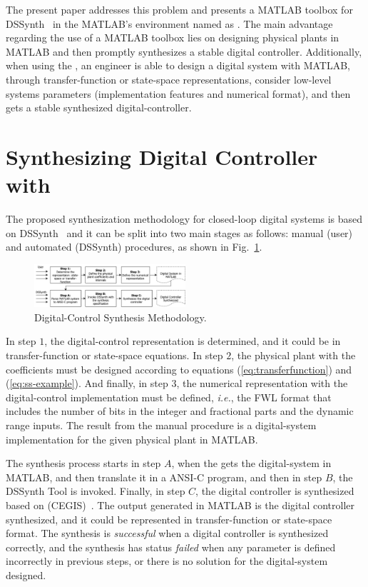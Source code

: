 The present paper addresses this problem and presents a MATLAB toolbox for DSSynth~\cite{abate2017, abatecav2017} in the MATLAB's environment named as \tool. The main advantage regarding the use of a MATLAB toolbox lies on designing physical plants in MATLAB and then promptly synthesizes a stable digital controller. Additionally, when using the \tool, an engineer is able to design a digital system with MATLAB, through transfer-function or state-space representations, consider low-level systems parameters (implementation features and numerical format), and then gets a stable synthesized digital-controller.

\section{Synthesizing Digital Controller with \tool}

The proposed synthesization methodology for closed-loop digital systems is based on DSSynth~\cite{abate2017, abatecav2017} and it can be split into two main stages as follows: manual (user) and automated (DSSynth) procedures, as shown in Fig.~\ref{fig:synthesis-flow}. 

\begin{figure}[ht!]
\centering
\includegraphics[width=0.5\textwidth]{synthesis-flow.pdf}
\caption{Digital-Control Synthesis Methodology.}
\label{fig:synthesis-flow}
\end{figure}

In step $1$, the digital-control representation is determined, and it could be in transfer-function or state-space equations. In step $2$, the physical plant with the coefficients must be designed according to equations (\ref{eq:transferfunction}) and (\ref{eq:ss-example}). And finally, in step $3$, the numerical representation with the digital-control implementation must be defined, {\it i.e.}, the FWL format that includes the number of bits in the integer and fractional parts and the dynamic range inputs. The result from the manual procedure is a digital-system implementation for the given physical plant in MATLAB. 

The synthesis process starts in step $A$, when the \tool gets the digital-system in MATLAB, and then translate it in a ANSI-C program, and then in step $B$, the DSSynth Tool is invoked. Finally, in step $C$, the digital controller is synthesized based on (CEGIS)~\cite{DBLP:conf/asplos/Solar-LezamaTBSS06}. The output generated in MATLAB is the digital controller synthesized, and it could be represented in transfer-function or state-space format. The synthesis is \emph{successful} when a digital controller is synthesized correctly, and the synthesis has status \emph{failed} when any parameter is defined incorrectly in previous steps, or there is no solution for the digital-system designed.
 
